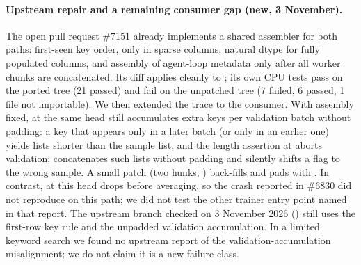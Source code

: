 \documentclass[11pt,a4paper]{article}
\newcommand{\pr}[1]{\#{#1}}
\begin{document}
\paragraph{Upstream repair and a remaining consumer gap (new, 3 November).} The open pull request \pr{7151} \cite{verl7151} already implements a shared assembler for both paths: first-seen key order,  only in sparse columns, natural dtype for fully populated columns, and assembly of agent-loop metadata only after all worker chunks are concatenated. Its diff applies cleanly to ; its own CPU tests pass on the ported tree (21 passed) and fail on the unpatched tree (7 failed, 6 passed, 1 file not importable). We then extended the trace to the consumer. With assembly fixed,  at the same head still accumulates extra keys per validation batch without padding: a key that appears only in a later batch (or only in an earlier one) yields lists shorter than the sample list, and the length assertion at  aborts validation;  concatenates such lists without padding and silently shifts a flag to the wrong sample. A small patch (two hunks, ) back-fills and pads with . In contrast,  at this head drops  before averaging, so the crash reported in \pr{6830} \cite{verl6830} did not reproduce on this path; we did not test the other trainer entry point named in that report. The upstream  branch checked on 3 November 2026 () still uses the first-row key rule and the unpadded validation accumulation. In a limited keyword search we found no upstream report of the validation-accumulation misalignment; we do not claim it is a new failure class.
\end{document}
